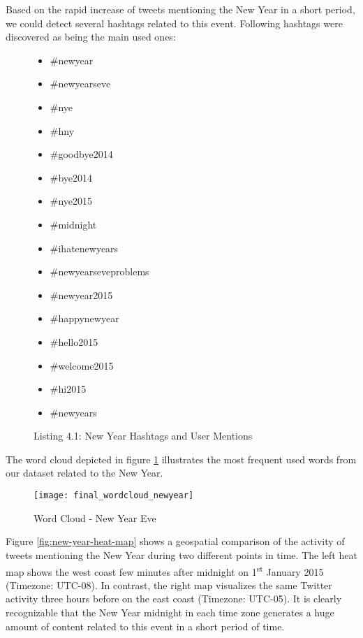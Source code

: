 Based on the rapid increase of tweets mentioning the New Year in a short period, we could detect several hashtags related to this event. Following hashtags were discovered as being the main used ones:

\begin{figure}[H]
\begin{multicols}{3}
  \begin{itemize}[label={}]
  \item \#newyear
  \item \#newyearseve
  \item \#nye
  \item \#hny
  \item \#goodbye2014
  \item \#bye2014
  \item \#nye2015
  \item \#midnight
  \item \#ihatenewyears
  \item \#newyearseveproblems
  \item \#newyear2015
  \item \#happynewyear
  \item \#hello2015
  \item \#welcome2015
  \item \#hi2015
  \item \#newyears
\end{itemize}
\fixspacing
\end{multicols}
\caption*{Listing 4.1: New Year Hashtags and User Mentions}
\end{figure}

The word cloud depicted in figure \ref{fig:new-year-word-cloud} illustrates the most frequent used words from our dataset related to the New Year.

\begin{figure}[H]
  \centering
        \texttt{[image: final\_wordcloud\_newyear]}
  \caption[Word Cloud - New Year Eve]{Word Cloud - New Year Eve}
  \label{fig:new-year-word-cloud}
  \vspace{-1.3em}
\end{figure}

Figure \ref{fig:new-year-heat-map} shows a geospatial comparison of the activity of tweets mentioning the New Year during  two different points in time. The left heat map shows the west coast few minutes after midnight on 1\textsuperscript{st} January 2015 (Timezone: UTC-08). In contrast, the right map visualizes the same Twitter activity three hours before on the east coast (Timezone: UTC-05). It is clearly recognizable that the New Year midnight in each time zone generates a huge amount of content related to this event in a short period of time.

